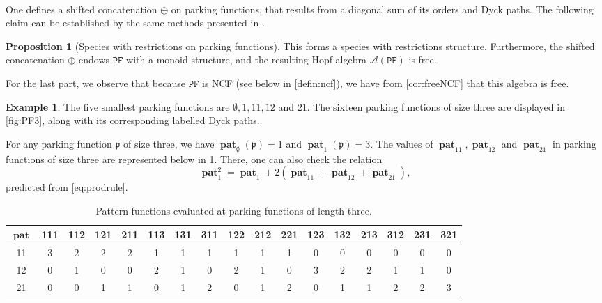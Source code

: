 \documentclass[12pt, reqno]{amsart}
\theoremstyle{definition}
\newtheorem{prop}[thm]{Proposition}
\newtheorem{smpl}[thm]{Example}
\DeclareMathOperator{\pat}{\mathbf{pat}}
\begin{document}
\

One defines a shifted concatenation $\oplus$ on parking functions, that results from a diagonal sum of its orders and Dyck paths.
The following claim can be established by the same methods presented in \cite{Penaguiao2020}.

\begin{prop}[Species with restrictions on parking functions]
This forms a species with restrictions structure.
Furthermore, the shifted concatenation $\oplus $ endows $\mathtt{PF}$ with a monoid structure, and the resulting Hopf algebra $\mathcal A(\mathtt{PF})$ is free.
\end{prop}

For the last part, we observe that because $\mathtt{PF}$ is NCF (see below in \cref{defin:ncf}), we have from \cref{cor:freeNCF} that this algebra is free.

\begin{smpl}
The five smallest parking functions are $\emptyset, 1, 11, 12$ and $21$.
The sixteen parking functions of size three are displayed in \cref{fig:PF3}, along with its corresponding labelled Dyck paths.

For any parking function $\mathfrak p$ of size three, we have $\pat_{\emptyset}(\mathfrak p) = 1$ and $\pat_1(\mathfrak p) = 3$.
The values of $\pat_{11}, \pat_{12}$ and $\pat_{21}$ in parking functions of size three are represented below in \cref{tab:PF3}.
There, one can also check the relation 
\[\pat_1^2 = \pat_1 + 2(\pat_{11} + \pat_{12} + \pat_{21}),\] 
predicted from \eqref{eq:prodrule}.
\end{smpl}
\begin{table}
\begin{tabular}{ c |  c c c c c c c c c c c c c c c c}
 $\pat$ & \small{111} & \small{112} & \small{121} & \small{211} & \small{113} &
\small{131} & \small{311} & \small{122} & \small{212} & \small{221} & \small{123} & \small{132} & \small{213} & \small{312} & \small{231} & \small{321}\\ 
 \hline 
 11 & 3 & 2 & 2 & 2 & 1 & 1 & 1 & 1 & 1 & 1 & 0 & 0 & 0 & 0 & 0 & 0 \\  
 12 & 0 & 1 & 0 & 0 & 2 & 1 & 0 & 2 & 1 & 0 & 3 & 2 & 2 & 1 & 1 & 0 \\  
 21 & 0 & 0 & 1 & 1 & 0 & 1 & 2 & 0 & 1 & 2 & 0 & 1 & 1 & 2 & 2 & 3 \end{tabular}
\caption{\label{tab:PF3}Pattern functions evaluated at parking functions of length three.}
\end{table}
\end{document}
